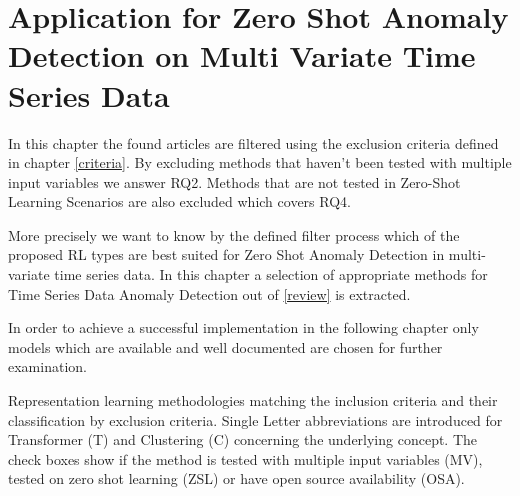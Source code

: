 \section{Application for Zero Shot Anomaly Detection on Multi Variate Time Series Data}\label{application}
In this chapter the found articles are filtered using the exclusion criteria defined in chapter \ref{criteria}. By excluding methods that haven't been tested with multiple input variables we answer RQ2. Methods that are not tested in Zero-Shot Learning Scenarios are also excluded which covers RQ4.

More precisely we want to know by the defined filter process which of the proposed RL types are best suited for Zero Shot Anomaly Detection in multi-variate time series data. In this chapter a selection of appropriate methods for Time Series Data Anomaly Detection out of \ref{review} is extracted.

 In order to achieve a successful implementation in the following chapter only models which are available and well documented are chosen for further examination. 
 \begin{table}
   \caption{Representation learning methodologies matching the inclusion criteria and their classification by exclusion criteria. Single Letter abbreviations are introduced for Transformer (T) and Clustering (C) concerning the underlying concept. The check boxes show if the method is tested with multiple input variables (MV), tested on zero shot learning (ZSL) or have open source availability (OSA).}\label{tab_rl_methods}
   
 \end{table}
